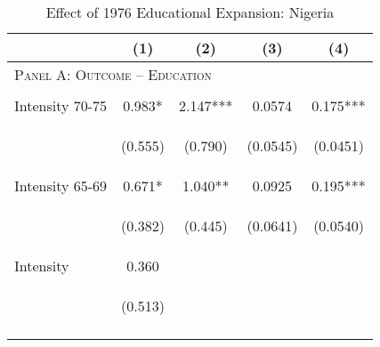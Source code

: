 \begin{subtables}\begin{table}[htpb!]\begin{center}\caption{Effect of 1976 Educational Expansion: Nigeria}\label{MMRtab:Nigeria}\begin{tabular}{p{5cm}cccc}\toprule&(1)&(2)&(3)&(4)\\ \midrule\multicolumn{5}{l}{\textsc{Panel A: Outcome -- Education}}\\\begin{footnotesize}\end{footnotesize}&\begin{footnotesize}\end{footnotesize}&\begin{footnotesize}\end{footnotesize}&\begin{footnotesize}\end{footnotesize}\\ 
Intensity 70-75&0.983*&2.147***&0.0574&0.175***\\ 
&\begin{footnotesize}(0.555)\end{footnotesize}&\begin{footnotesize}(0.790)\end{footnotesize}&\begin{footnotesize}(0.0545)\end{footnotesize}&\begin{footnotesize}(0.0451)\end{footnotesize}\\ 
Intensity 65-69&0.671*&1.040**&0.0925&0.195***\\ 
&\begin{footnotesize}(0.382)\end{footnotesize}&\begin{footnotesize}(0.445)\end{footnotesize}&\begin{footnotesize}(0.0641)\end{footnotesize}&\begin{footnotesize}(0.0540)\end{footnotesize}\\ 
Intensity      &0.360&&&\\ 
&\begin{footnotesize}(0.513)\end{footnotesize}&&\\ 
\begin{footnotesize}\end{footnotesize}&\begin{footnotesize}\end{footnotesize}&\begin{footnotesize}\end{footnotesize}&\begin{footnotesize}\end{footnotesize}\\ 

\end{tabular}
\end{center}
\end{table}
\end{subtables}
